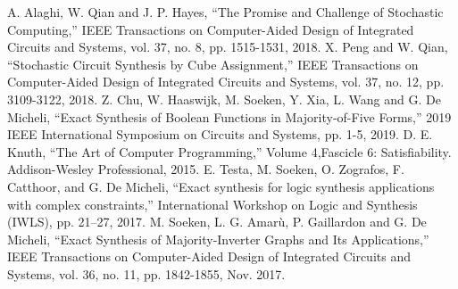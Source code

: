 \documentclass[conference,letterpaper]{IEEEtran}
\begin{document}
\begin{thebibliography}{10}
A. Alaghi, W. Qian and J. P. Hayes, ``The Promise and Challenge of Stochastic Computing,'' IEEE Transactions on Computer-Aided Design of Integrated Circuits and Systems, vol. 37, no. 8, pp. 1515-1531, 2018.
X. Peng and W. Qian, ``Stochastic Circuit Synthesis by Cube Assignment,'' IEEE Transactions on Computer-Aided Design of Integrated Circuits and Systems, vol. 37, no. 12, pp. 3109-3122, 2018.
Z. Chu, W. Haaswijk, M. Soeken, Y. Xia, L. Wang and G. De Micheli, ``Exact Synthesis of Boolean Functions in Majority-of-Five Forms,'' 2019 IEEE International Symposium on Circuits and Systems, pp. 1-5,  2019.
D. E. Knuth, ``The Art of Computer Programming,'' Volume 4,Fascicle 6: Satisfiability. Addison-Wesley Professional, 2015.
E. Testa, M. Soeken, O. Zografos, F. Catthoor, and G. De Micheli, ``Exact synthesis for logic synthesis applications with complex constraints,'' International Workshop on Logic and Synthesis (IWLS), pp. 21–27, 2017.
M. Soeken, L. G. Amarù, P. Gaillardon and G. De Micheli, ``Exact Synthesis of Majority-Inverter Graphs and Its Applications,'' IEEE Transactions on Computer-Aided Design of Integrated Circuits and Systems, vol. 36, no. 11, pp. 1842-1855, Nov. 2017.
\end{thebibliography}

%
\end{document}
